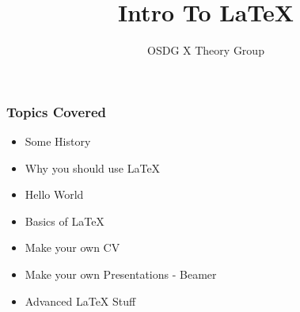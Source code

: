 \documentclass[hyperref={colorlinks=true,linkcolor=blue}]{beamer}
\title{Intro To \LaTeX}
\author{OSDG X Theory Group}
\begin{document}
\maketitle

\begin{frame}
    \frametitle{Topics Covered}
    \begin{itemize}
        \item Some History
        \item Why you should use LaTeX
        \item Hello World
        \item Basics of LaTeX
        \item Make your own CV
        \item Make your own Presentations - Beamer
        \item Advanced LaTeX Stuff
    \end{itemize}
\end{frame}









\end{document}
